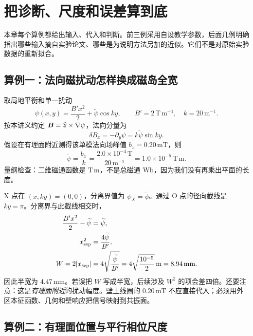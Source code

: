 \chapter{把诊断、尺度和误差算到底}
\label{tm:chap:worked}

本章每个算例都给出输入、代入和判断。前三例采用自设教学参数，后面几例明确指出哪些输入摘自实验论文、哪些是为说明方法另加的近似。它们不是对原始实验数据的重新拟合。

\section{算例一：法向磁扰动怎样换成磁岛全宽}

取局地平衡和单一扰动
\begin{equation}
 \psi(x,y)=\frac{B'x^2}{2}+\widetilde\psi\cos ky,
 \qquad B'=2\,\mathrm{T\,m^{-1}},\quad k=20\,\mathrm{m^{-1}}.
\end{equation}
按本讲义约定 $\bm{B}=\widehat{\bm{z}}\times\nabla\psi$，法向分量为
\begin{equation}
 \delta B_x=-\partial_y\psi=k\widetilde\psi\sin ky.
\end{equation}
假设在有理面附近测得该单模法向场峰值 $b_x=0.20\,\mathrm{mT}$，则
\begin{equation}
 \widetilde\psi=\frac{b_x}{k}
 =\frac{2.0\times10^{-4}\,\mathrm T}{20\,\mathrm{m^{-1}}}
 =1.0\times10^{-5}\,\mathrm{T\,m}.
\end{equation}
量纲检查：二维磁通函数是 $\mathrm{T\,m}$，不是总磁通 $\mathrm{Wb}$，因为我们没有再乘出平面的长度。

X 点在 $(x,ky)=(0,0)$，分离界值为 $\psi_X=\widetilde\psi$。通过 O 点的径向截线是 $ky=\pi$。分离界与此截线相交时，
\begin{align}
 \frac{B'x^2}{2}-\widetilde\psi&=\widetilde\psi,\\
 x_{\rm sep}^2&=\frac{4\widetilde\psi}{B'},\\
 W=2|x_{\rm sep}|&=4\sqrt{\frac{\widetilde\psi}{B'}}
 =4\sqrt{\frac{10^{-5}}{2}}\,\mathrm m
 =8.94\,\mathrm{mm}.
 \label{tm:worked_width}
\end{align}
因此半宽为 $4.47\,\mathrm{mm}$。若误把 $W$ 写成半宽，后续涉及 $W^2$ 的项会差四倍。还要注意：这是\emph{有理面附近}的扰动幅度。壁上线圈的 $0.20\,\mathrm{mT}$ 不应直接代入；必须用外区本征函数、几何和壁响应把信号映射到共振面。

\section{算例二：有理面位置与平行相位尺度}

